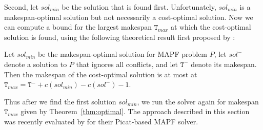 Second, let $sol_{min}$ be the solution that is found first. Unfortunately, $sol_{min}$ is a makespan-optimal solution but not necessarily a cost-optimal solution. Now we can compute a bound for the largest makespan $\mathtt{T}_{max}$ at which the cost-optimal solution is found, using the following theoretical result first proposed by :
\begin{theorem}\label{thm:optimal}
Let $sol_{min}$ be the makespan-optimal solution for MAPF problem $P$, let $sol^-$ denote a solution to $P$ that ignores all conflicts, and let $\mathtt{T}^-$ denote its makespan. Then the makespan of the cost-optimal solution is at most at $\mathtt{T}_{max}=\mathtt{T}^- + c(sol_{min})-c(sol^-)-1$.
\end{theorem}
Thus after we find the first solution $sol_{min}$, we run the solver again for makespan $\mathtt{T}_{max}$ given by Theorem~\ref{thm:optimal}. The approach described in this section was recently evaluated by  for their Picat-based MAPF solver.








